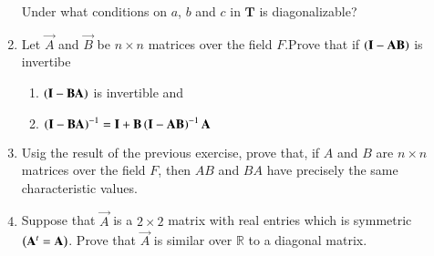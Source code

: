 \begin{enumerate}[label=\thesubsection.\arabic*.,ref=\thesubsection.\theenumi]
	Under what conditions on $a$, $b$ and $c$ in $\mathbf{T}$ is diagonalizable?
%
\\
\solution

\twocolumn
\item Let $\vec{A}$ and $\vec{B}$ be $n\times n$ matrices over the field $F$.Prove that if $\left(\mathbf{I}-\mathbf{A}\mathbf{B}\right)$ is invertibe
\begin{enumerate}
    \item $\left(\mathbf{I}-\mathbf{B}\mathbf{A}\right)$ is invertible and
    \item $\left(\mathbf{I}-\mathbf{B}\mathbf{A}\right)^{-1}=\mathbf{I}+\mathbf{B}\left(\mathbf{I}-\mathbf{A}\mathbf{B}\right)^{-1}\mathbf{A}$
\end{enumerate}
%
\solution

\item Usig the result of the previous exercise, prove that, if $A$ and $B$ are $n \times n$ matrices over the field $F$, then $AB$ and $BA$ have precisely the same characteristic values.
%
\solution

\item Suppose that $\vec{A}$ is a $2\times2$ matrix with real entries which is symmetric $\left(\mathbf{A}^t=\mathbf{A}\right)$.
Prove that $\vec{A}$ is similar over $\mathbb{R}$ to a diagonal matrix. 
%
\\
\solution

\twocolumn
\end{enumerate}
